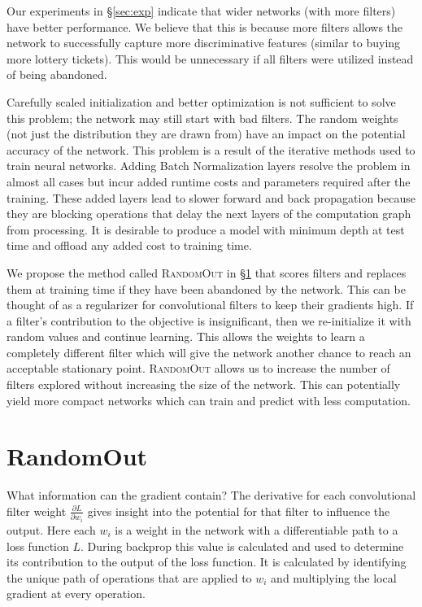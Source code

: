 \documentclass{article}
\begin{document}
Our experiments in \S \ref{sec:exp} indicate that wider networks (with more filters) have better performance. We believe that this is because more filters allows the network to successfully capture more discriminative features (similar to buying more lottery tickets). This would be unnecessary if all filters were utilized instead of being abandoned.
	
	


Carefully scaled initialization \cite{glorot_understanding_2010} and better optimization is not sufficient to solve this problem; the network may still start with bad filters. The random weights (not just the distribution they are drawn from) have an impact on the potential accuracy of the network. This problem is a result of the iterative methods used to train neural networks. Adding Batch Normalization \cite{Ioffe2015} layers resolve the problem in almost all cases but incur added runtime costs and parameters required after the training. These added layers lead to slower forward and back propagation because they are blocking operations that delay the next layers of the computation graph from processing. It is desirable to produce a model with minimum depth at test time and offload any added cost to training time.

We propose the method called \textsc{RandomOut} in \S \ref{sec:ro} that scores filters and replaces them at training time if they have been abandoned by the network. This can be thought of as a regularizer for convolutional filters to keep their gradients high. If a filter's contribution to the objective is insignificant, then we re-initialize it with random values and continue learning. This allows the weights to learn a completely different filter which will give the network another chance to reach an acceptable stationary point. \textsc{RandomOut} allows us to increase the number of filters explored without increasing the size of the network. This can potentially yield more compact networks which can train and predict with less computation.



\section{RandomOut}
\label{sec:ro}

	What information can the gradient contain? The derivative for each convolutional filter weight $\frac{\partial L}{\partial w_i}$ gives insight into the potential for that filter to influence the output. Here each $w_i$ is a weight in the network with a differentiable path to a loss function $L$. During backprop this value is calculated and used to determine its contribution to the output of the loss function. It is calculated by identifying the unique path of operations that are applied to $w_i$ and multiplying the local gradient at every operation. 
	
\end{document}
